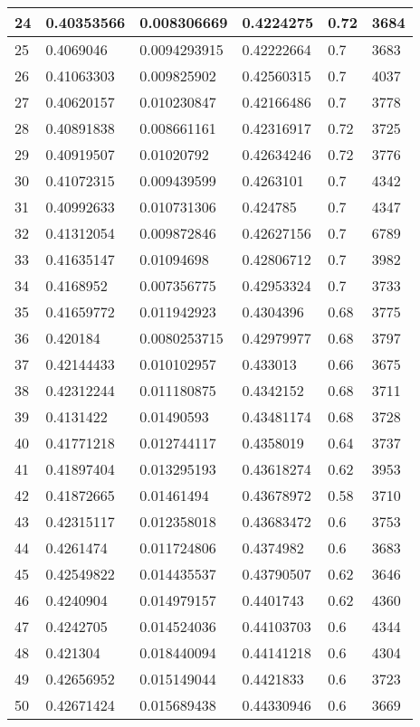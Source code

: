 \begin{longtable}{|l|l|l|l|l|l|}
24 & 0.40353566 & 0.008306669 & 0.4224275 & 0.72 & 3684 \\ \hline 
25 & 0.4069046 & 0.0094293915 & 0.42222664 & 0.7 & 3683 \\ \hline 
26 & 0.41063303 & 0.009825902 & 0.42560315 & 0.7 & 4037 \\ \hline 
27 & 0.40620157 & 0.010230847 & 0.42166486 & 0.7 & 3778 \\ \hline 
28 & 0.40891838 & 0.008661161 & 0.42316917 & 0.72 & 3725 \\ \hline 
29 & 0.40919507 & 0.01020792 & 0.42634246 & 0.72 & 3776 \\ \hline 
30 & 0.41072315 & 0.009439599 & 0.4263101 & 0.7 & 4342 \\ \hline 
31 & 0.40992633 & 0.010731306 & 0.424785 & 0.7 & 4347 \\ \hline 
32 & 0.41312054 & 0.009872846 & 0.42627156 & 0.7 & 6789 \\ \hline 
33 & 0.41635147 & 0.01094698 & 0.42806712 & 0.7 & 3982 \\ \hline 
34 & 0.4168952 & 0.007356775 & 0.42953324 & 0.7 & 3733 \\ \hline 
35 & 0.41659772 & 0.011942923 & 0.4304396 & 0.68 & 3775 \\ \hline 
36 & 0.420184 & 0.0080253715 & 0.42979977 & 0.68 & 3797 \\ \hline 
37 & 0.42144433 & 0.010102957 & 0.433013 & 0.66 & 3675 \\ \hline 
38 & 0.42312244 & 0.011180875 & 0.4342152 & 0.68 & 3711 \\ \hline 
39 & 0.4131422 & 0.01490593 & 0.43481174 & 0.68 & 3728 \\ \hline 
40 & 0.41771218 & 0.012744117 & 0.4358019 & 0.64 & 3737 \\ \hline 
41 & 0.41897404 & 0.013295193 & 0.43618274 & 0.62 & 3953 \\ \hline 
42 & 0.41872665 & 0.01461494 & 0.43678972 & 0.58 & 3710 \\ \hline 
43 & 0.42315117 & 0.012358018 & 0.43683472 & 0.6 & 3753 \\ \hline 
44 & 0.4261474 & 0.011724806 & 0.4374982 & 0.6 & 3683 \\ \hline 
45 & 0.42549822 & 0.014435537 & 0.43790507 & 0.62 & 3646 \\ \hline 
46 & 0.4240904 & 0.014979157 & 0.4401743 & 0.62 & 4360 \\ \hline 
47 & 0.4242705 & 0.014524036 & 0.44103703 & 0.6 & 4344 \\ \hline 
48 & 0.421304 & 0.018440094 & 0.44141218 & 0.6 & 4304 \\ \hline 
49 & 0.42656952 & 0.015149044 & 0.4421833 & 0.6 & 3723 \\ \hline 
50 & 0.42671424 & 0.015689438 & 0.44330946 & 0.6 & 3669 \\ \hline 
\end{longtable}